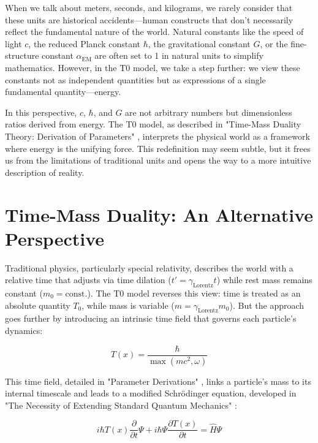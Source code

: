 \documentclass[a4paper,12pt]{article}
\newcommand{\Tfield}{T(x)}
\newcommand{\alphaEM}{\alpha_{\text{EM}}}
\newcommand{\gammaf}{\gamma_{\text{Lorentz}}}
\begin{document}
	When we talk about meters, seconds, and kilograms, we rarely consider that these units are historical accidents—human constructs that don't necessarily reflect the fundamental nature of the world. Natural constants like the speed of light \(c\), the reduced Planck constant \(\hbar\), the gravitational constant \(G\), or the fine-structure constant \(\alphaEM\) are often set to 1 in natural units to simplify mathematics. However, in the T0 model, we take a step further: we view these constants not as independent quantities but as expressions of a single fundamental quantity—energy.
	
	In this perspective, \(c\), \(\hbar\), and \(G\) are not arbitrary numbers but dimensionless ratios derived from energy. The T0 model, as described in "Time-Mass Duality Theory: Derivation of Parameters" \cite{pascher_params_2025}, interprets the physical world as a framework where energy is the unifying force. This redefinition may seem subtle, but it frees us from the limitations of traditional units and opens the way to a more intuitive description of reality.
	
	\section{Time-Mass Duality: An Alternative Perspective}
	
	Traditional physics, particularly special relativity, describes the world with a relative time that adjusts via time dilation (\(t' = \gammaf t\)) while rest mass remains constant (\(m_0 = \text{const.}\)). The T0 model reverses this view: time is treated as an absolute quantity \(T_0\), while mass is variable (\(m = \gammaf m_0\)). But the approach goes further by introducing an intrinsic time field that governs each particle's dynamics:
	
	\begin{equation}
		\Tfield = \frac{\hbar}{\max(m c^2, \omega)}
	\end{equation}
	
	This time field, detailed in "Parameter Derivations" \cite{pascher_params_2025}, links a particle's mass to its internal timescale and leads to a modified Schrödinger equation, developed in "The Necessity of Extending Standard Quantum Mechanics" \cite{pascher_erweiterung_2025}:
	
	\begin{equation}
		i\hbar \Tfield \frac{\partial}{\partial t} \Psi + i\hbar \Psi \frac{\partial \Tfield}{\partial t} = \hat{H} \Psi
	\end{equation}
	
\end{document}
